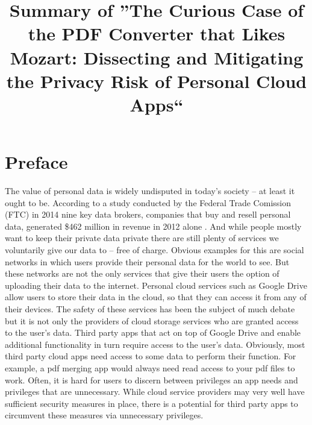\documentclass[11pt,twocolumn,a4paper,DIV=calc]{scrartcl}
\begin{document}
\title{Summary of ''The Curious Case of the PDF Converter that Likes Mozart: Dissecting and Mitigating the Privacy Risk of Personal Cloud Apps``}
\date{}
\maketitle

\section{Preface}
The value of personal data is widely undisputed in today’s society – at least it ought to be. According to a study conducted by the Federal Trade Comission (FTC) in 2014 nine key data brokers, companies that buy and resell personal data, generated \$462 million in revenue in 2012 alone \cite{FTCStudy}. And while people mostly want to keep their private data private \cite{WorthOfData} there are still plenty of services we voluntarily give our data to – free of charge. Obvious examples for this are social networks in which users provide their personal data for the world to see. But these networks are not the only services that give their users the option of uploading their data to the internet. Personal cloud services such as Google Drive allow users to store their data in the cloud, so that they can access it from any of their devices. The safety of these services has been the subject of much debate \cite{CloudSecurity} but it is not only the providers of cloud storage services who are granted access to the user's data. Third party apps that act on top of Google Drive and enable additional functionality in turn require access to the user’s data. Obviously, most third party cloud apps need access to some data to perform their function. For example, a pdf merging app would always need read access to your pdf files to work. Often, it is hard for users to discern between privileges an app needs and privileges that are unnecessary. While cloud service providers may very well have sufficient security measures in place, there is a potential for third party apps to circumvent these measures via unnecessary privileges.
\end{document}

